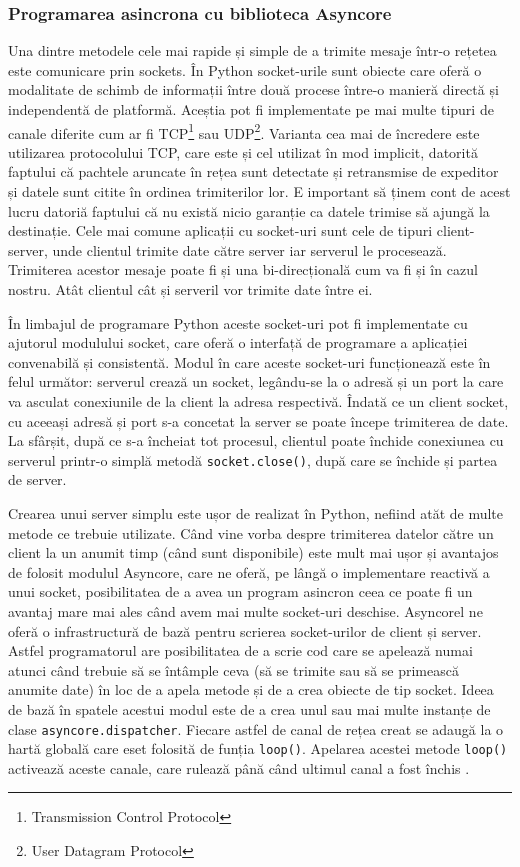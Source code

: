 \documentclass[../IoMusT.tex]{subfiles}
\begin{document}
\subsubsection{Programarea asincrona cu biblioteca Asyncore}
Una dintre metodele cele mai rapide și simple de a trimite mesaje într-o rețetea este comunicare prin sockets. În Python socket-urile sunt obiecte care oferă o modalitate de schimb de informații între două procese între-o manieră directă și independentă de platformă. Aceștia pot fi implementate pe mai multe tipuri de canale diferite cum ar fi TCP\footnote{Transmission Control Protocol} sau UDP\footnote{User Datagram Protocol}. Varianta cea mai de încredere este utilizarea protocolului TCP, care este și cel utilizat în mod implicit, datorită faptului că pachtele aruncate în rețea sunt detectate și retransmise de expeditor și datele sunt citite în ordinea trimiterilor lor. E important să ținem cont de acest lucru datoriă faptului că nu există nicio garanție ca datele trimise să ajungă la destinație. Cele mai comune aplicații cu socket-uri sunt cele de tipuri client-server, unde clientul trimite date către server iar serverul le procesează. Trimiterea acestor mesaje poate fi și una bi-direcțională cum va fi și în cazul nostru. Atât clientul cât și serveril vor trimite date între ei.
\\
\par În limbajul de programare Python aceste socket-uri pot fi implementate cu ajutorul modulului socket, care oferă o interfață de programare a aplicației convenabilă și consistentă. Modul în care aceste socket-uri funcționează este în felul următor: serverul crează un socket, legându-se la o adresă și un port la care va asculat conexiunile de la client la adresa respectivă. Îndată ce un client socket, cu aceeași adresă și port s-a concetat la server se poate începe trimiterea de date. La sfârșit, după ce s-a încheiat tot procesul, clientul poate închide conexiunea cu serverul printr-o simplă metodă \verb|socket.close()|, după care se închide și partea de server.
\\
\par Crearea unui server simplu este ușor de realizat în Python, nefiind atăt de multe metode ce trebuie utilizate. Când vine vorba despre trimiterea datelor către un client la un anumit timp (când sunt disponibile) este mult mai ușor și avantajos de folosit modulul Asyncore, care ne oferă, pe lângă o implementare reactivă a unui socket, posibilitatea de a avea un program asincron ceea ce poate fi un avantaj mare mai ales când avem mai multe socket-uri deschise. Asyncorel ne oferă o infrastructură de bază pentru scrierea socket-urilor de client și server. Astfel programatorul are posibilitatea de a scrie cod care se apelează numai atunci când trebuie să se întâmple ceva (să se trimite sau să se primească anumite date) în loc de a apela metode și de a crea obiecte de tip socket. Ideea de bază în spatele acestui modul este de a crea unul sau mai multe instanțe de clase \verb|asyncore.dispatcher|. Fiecare astfel de canal de rețea creat se adaugă la o hartă globală care eset folosită de funția \verb|loop()|. Apelarea acestei metode \verb|loop()| activează aceste canale, care rulează până când ultimul canal a fost închis \cite{Async}.
\end{document}
